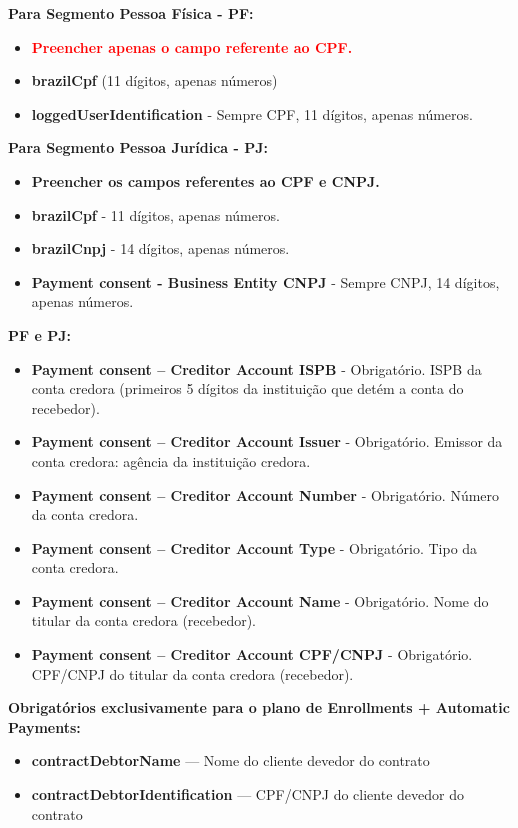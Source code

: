 \textbf{Para Segmento Pessoa Física - PF:}

\begin{itemize}
    \item \textbf{\textcolor{red}{Preencher apenas o campo referente ao CPF.}}
    \item \textbf{\textcolor{red!80}{brazilCpf}} (11 dígitos, apenas números)
    \item \textbf{\textcolor{red!80}{loggedUserIdentification}} - Sempre CPF, 11 dígitos, apenas números.
\end{itemize}

\textbf{Para Segmento Pessoa Jurídica - PJ:}
\begin{itemize}
    \item \textbf{\textcolor{red!80}{Preencher os campos referentes ao CPF e CNPJ.}}
    \item \textbf{\textcolor{red!80}{brazilCpf}} - 11 dígitos, apenas números.
    \item \textbf{\textcolor{red!80}{brazilCnpj}} - 14 dígitos, apenas números.
    \item \textbf{\textcolor{red!80}{Payment consent - Business Entity CNPJ}} - Sempre CNPJ, 14 dígitos, apenas números.
\end{itemize}

\textbf{PF e PJ:}
\begin{itemize}
    \item \textbf{\textcolor{red!80}{Payment consent – Creditor Account ISPB}} - Obrigatório. ISPB da conta credora (primeiros 5 dígitos da instituição que detém a conta do recebedor).
    \item \textbf{\textcolor{red!80}{Payment consent – Creditor Account Issuer}} - Obrigatório. Emissor da conta credora: agência da instituição credora.
    \item \textbf{\textcolor{red!80}{Payment consent – Creditor Account Number}} - Obrigatório. Número da conta credora.
    \item \textbf{\textcolor{red!80}{Payment consent – Creditor Account Type}} - Obrigatório. Tipo da conta credora.
    \item \textbf{\textcolor{red!80}{Payment consent – Creditor Account Name}} - Obrigatório. Nome do titular da conta credora (recebedor).
    \item \textbf{\textcolor{red!80}{Payment consent – Creditor Account CPF/CNPJ}} - Obrigatório. CPF/CNPJ do titular da conta credora (recebedor).
\end{itemize}
\medskip
\textbf{Obrigatórios exclusivamente para o plano de Enrollments + Automatic Payments:}
\begin{itemize}
    \item \textbf{\textcolor{red!80}{contractDebtorName}} — Nome do cliente devedor do contrato
    \item \textbf{\textcolor{red!80}{contractDebtorIdentification}} — CPF/CNPJ do cliente devedor do contrato
\end{itemize}

